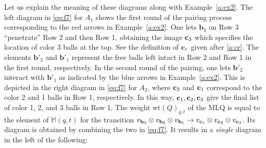 \documentclass[11pt]{article}
\theoremstyle{definition}
\numberwithin{equation}{section}
\newcommand{\bb}{\mathbf{b}}
\begin{document}
Let us explain the meaning of these diagrams along with Example~\ref{a:ex2}. 
The left diagram in \eqref{eq:f7} for $A_1$ 
shows the first round of the pairing process corresponding to the red arrows in Example~\ref{a:ex2}. 
One lets $\bb_3$ on Row 3 ``penetrate'' Row 2 and then Row 1, obtaining the image ${\bf c}_3$ 
which specifies the location of color 3 balls at the top. See the definition of ${\bf c}_r$ given after \eqref{a:cr}.
The elements $\bb'_2$ and $\bb'_1$ represent the free balls left intact in Row 2 and Row 1 
in the first round, respectively.
In the second round of the pairing, one lets $\bb'_2$ interact with $\bb'_1$ 
as indicated by the blue arrows in Example~\ref{a:ex2}. 
This is depicted in the right diagram in \eqref{eq:f7} for $A_2$, 
where ${\bf c}_2$ and ${\bf c}_1$ correspond to the color 2 and 1 balls in Row 1, respectively. 
In this way, ${\bf c}_1, {\bf c}_2, {\bf c}_3$ give the final list of color 1, 2, and 3 balls in Row 1. 
The weight $\text{wt}(Q)_{q,t}$ of the MLQ is equal to the element of $\mathbb{M}(q,t)$ for the transition 
$v_{\bb_3} \otimes v_{\bb_2} \otimes v_{\bb_1} 
\rightarrow v_{{\bf c}_1} \otimes v_{{\bf c}_2} \otimes v_{{\bf c}_3}$.
 Its diagram is obtained by combining the two in \eqref{eq:f7}.
 It results in a \textit{single} diagram in the left of the following:
 
\end{document}
